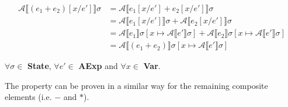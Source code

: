 \documentclass{article}
\begin{document}
\begin{enumerate}[(a)]
    \begin{equation*}
    \begin{split}
      \mathcal{A}\llbracket (e_1 + e_2)[x/e'] \rrbracket \sigma &=
      \mathcal{A}\llbracket e_1[x/e'] + e_2[x/e']\rrbracket \sigma\\ 
      &= \mathcal{A}\llbracket e_1[x/e']\rrbracket\sigma +
          \mathcal{A}\llbracket e_2[x/e']\rrbracket\sigma\\
      &=
      \mathcal{A}\llbracket e_1\rrbracket \sigma[x \mapsto
      \mathcal{A}\llbracket e' \rrbracket \sigma] + 
      \mathcal{A}\llbracket e_2\rrbracket \sigma[x \mapsto
      \mathcal{A}\llbracket e' \rrbracket \sigma] \\ 
      &= \mathcal{A}\llbracket (e_1 + e_2)\rrbracket\sigma[x \mapsto
      \mathcal{A}\llbracket e' \rrbracket \sigma] 
    \end{split}
    \end{equation*}
 
    $\forall \sigma \in$ \textbf{State}, $\forall e' \in$ \textbf{AExp} 
    and $\forall x \in$ \textbf{Var}. 

    The property can be proven in a similar way for the remaining composite 
    elements (i.e. $-$ and $*$).
\end{enumerate}
\end{document}
